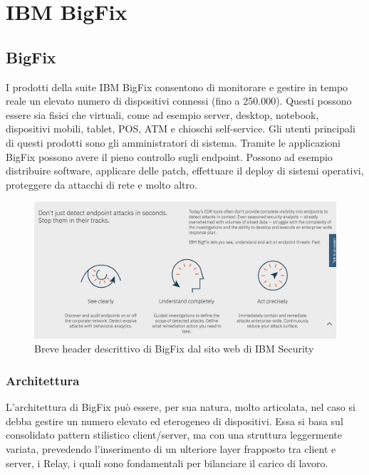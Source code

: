 \chapter{IBM BigFix}

\section{BigFix}
I prodotti della suite IBM BigFix consentono di monitorare e gestire in tempo reale un elevato numero di dispositivi connessi (fino a 250.000). Questi possono essere sia fisici che virtuali, come ad esempio server, desktop, notebook, dispositivi mobili, tablet, POS, ATM e chioschi self-service. Gli utenti principali di questi prodotti sono gli amministratori di sistema. Tramite le applicazioni BigFix possono avere il pieno controllo sugli endpoint. Possono ad esempio distribuire software, applicare delle patch, effettuare il deploy di sistemi operativi, proteggere da attacchi di rete e molto altro.
\begin{figure}[h!]
	\centering
	\includegraphics[width=\textwidth,keepaspectratio=true]{capitoli/imgs/BigFixManifest.png}
	\caption{Breve header descrittivo di BigFix dal sito web di IBM Security}
\end{figure}
\subsection{Architettura}
L'architettura di BigFix può essere, per sua natura, molto articolata, nel caso si debba gestire un numero elevato ed eterogeneo di dispositivi. Essa si basa sul consolidato pattern stilistico client/server, ma con una struttura leggermente variata, prevedendo l'inserimento di un ulteriore layer frapposto tra client e server, i Relay, i quali sono fondamentali per bilanciare il carico di lavoro.
